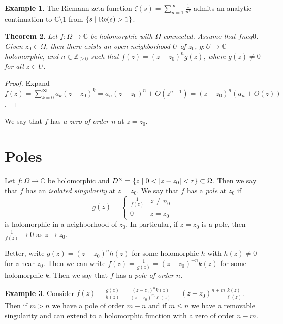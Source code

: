 \documentclass[leqno, openany]{memoir}
\newtheorem{thm}{Theorem}[section]
\theoremstyle{definition}
\newtheorem{exm}[thm]{Example}
\theoremstyle{remark}
\theoremstyle{plain}
\theoremstyle{definition}
\theoremstyle{remark}
\newcommand{\C}{\mathbb{C}}
\newcommand{\Z}{\mathbb{Z}}
\begin{document}
\begin{exm} The Riemann zeta function $\zeta(s) = \sum_{n=1}^{\infty}
\frac{1}{n^s}$ admits an analytic continuation to $\C \setminus \qty{1}$ from
$\qty{s \mid \Re(s) > 1}$.  \end{exm}

\begin{thm} Let $f \colon \Omega \to \C$ be holomorphic with $\Omega$
    connected. Assume that $f neq 0$. Given $z_0 \in \Omega$, then there exists
    an open neighborhood $U$ of $z_0$, $g \colon U \to \C$ holomorphic, and $n
    \in \Z_{\geq 0}$ such that $f(z) = {(z-z_0)}^n g(z)$, where $g(z) \neq 0$
    for all $z \in U$.  \end{thm}

\begin{proof} Expand $f(z) = \sum_{k=0}^{\infty} a_k {(z-z_0)}^k =
a_n{(z-z_0)}^n + O(z^{n+1}) = {(z-z_0)}^n (a_n + O(z))$.  \end{proof}

We say that $f$ has \textit{a zero of order $n$} at $z=z_0$.

\section{Poles}%

Let $f \colon \Omega \to \C$ be holomorphic and $D^{\times} = \qty{z \mid 0 <
\abs{z-z_0}<r} \subset \Omega$. Then we say that $f$ has an \textit{isolated
singularity} at $z = z_0$. We say that $f$ has a \textit{pole} at $z_0$ if \[
    g(z) = \begin{cases} \frac{1}{f(z)} & z \neq n_0 \\ 0 & z = z_0 \end{cases}
\] is holomorphic in a neighborhood of $z_0$. In particular, if $z = z_0$ is a
pole, then $\frac{1}{f(z)} \to 0$ as $z \to z_0$.

Better, write $g(z) = {(z-z_0)}^n h(z)$ for some holomorphic $h$ with $h(z)
\neq 0$ for $z$ near $z_0$. Then we can write $f(z) = \frac{1}{g(z)} =
{(z-z_0)}^{-n} k(z)$ for some holomorphic $k$. Then we say that $f$ has a
\textit{pole of order $n$}.

\begin{exm} Consider $f(z) = \frac{g(z)}{h(z)} = \frac{{(z-z_0)}^n
    k(z)}{{(z-z_0)}^m \ell(z)} = {(z-z_0)}^{n+m} \frac{k(z)}{\ell(z)}$. Then if
    $m > n$ we have a pole of order $m-n$ and if $m \leq n$ we have a removable
    singularity and can extend to a holomorphic function with a zero of order
    $n-m$.  \end{exm}
\end{document}

